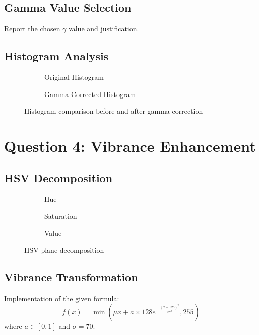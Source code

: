 \documentclass[12pt]{article}
\begin{document}
\subsection{Gamma Value Selection}
Report the chosen $\gamma$ value and justification.

\subsection{Histogram Analysis}
\begin{figure}[H]
    \centering
    \begin{subfigure}{0.45\textwidth}
        \fbox{\rule{0pt}{1.5in}\rule{2in}{0pt}}
        \caption{Original Histogram}
    \end{subfigure}
    \hfill
    \begin{subfigure}{0.45\textwidth}
        \fbox{\rule{0pt}{1.5in}\rule{2in}{0pt}}
        \caption{Gamma Corrected Histogram}
    \end{subfigure}
    \caption{Histogram comparison before and after gamma correction}
\end{figure}

\section{Question 4: Vibrance Enhancement}
\subsection{HSV Decomposition}
\begin{figure}[H]
    \centering
    \begin{subfigure}{0.3\textwidth}
        \fbox{\rule{0pt}{1.5in}\rule{1.5in}{0pt}}
        \caption{Hue}
    \end{subfigure}
    \hfill
    \begin{subfigure}{0.3\textwidth}
        \fbox{\rule{0pt}{1.5in}\rule{1.5in}{0pt}}
        \caption{Saturation}
    \end{subfigure}
    \hfill
    \begin{subfigure}{0.3\textwidth}
        \fbox{\rule{0pt}{1.5in}\rule{1.5in}{0pt}}
        \caption{Value}
    \end{subfigure}
    \caption{HSV plane decomposition}
\end{figure}

\subsection{Vibrance Transformation}
Implementation of the given formula:
\[
f(x) = \min\left(\mu x + a \times 128 e^{-\frac{(x-128)^2}{2\sigma^2}}, 255\right)
\]
where $a \in [0,1]$ and $\sigma = 70$.
\end{document}
